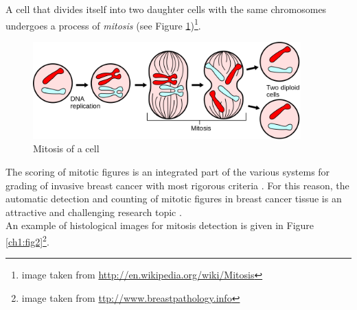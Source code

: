 \vspace{0.5cm}

A cell that divides itself into two daughter cells with the same chromosomes undergoes a process of \textit{mitosis}
(see Figure \ref{ch1:fig1})\footnote{image taken from \url{http://en.wikipedia.org/wiki/Mitosis}}.

\begin{figure}[!htbf]
 \centering
  \includegraphics[width=0.92\textwidth]{./images/Major_events_in_mitosis.png}
  \caption{Mitosis of a cell}
  \label{ch1:fig1}
\end{figure}

\vspace{0.5cm}


The scoring of mitotic figures is an integrated part of the various systems for grading of invasive breast cancer with most rigorous criteria \cite{breastCancerGrading01}.
For this reason, the automatic detection and counting of mitotic figures in breast cancer tissue is an attractive and challenging research
topic \cite{Mitosis01}.\\
An example of histological images for mitosis detection is given in Figure \ref{ch1:fig2}\footnote{image taken from \url{ttp://www.breastpathology.info}}.

